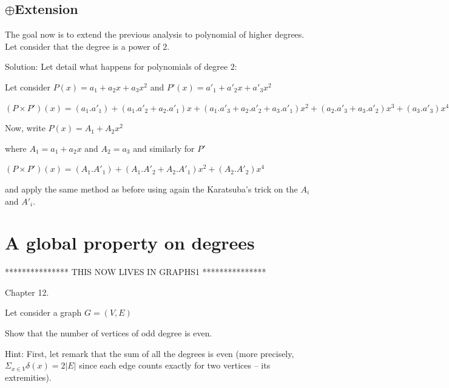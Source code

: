 \documentclass{article}[12pt]
\begin{document}
\subsection{$\oplus$Extension}

The goal now is to extend the previous analysis to polynomial of higher degrees.
Let consider that the degree is a power of $2$.
\bigskip

Solution:
Let detail what happens for polynomials of degree $2$:

Let consider $P(x) = a_1 + a_2 x + a_3 x^2$ and $P'(x) = a'_1 + a'_2 x + a'_3 x^2$

$(P \times P')(x) = (a_1.a'_1) + (a_1.a'_2 + a_2.a'_1) x + (a_1.a'_3 + a_2.a'_2 + a_3.a'_1) x^2 + (a_2.a'_3 + a_3.a'_2) x^3 +  (a_3.a'_3) x^4$
\bigskip

Now, write $P(x) = A_1 + A_2 x^2$ 

where $A_1 = a_1 + a_2 x$ and $A_2 = a_3$ and similarly for $P'$

$(P \times P')(x) = (A_1.A'_1) + (A_1.A'_2 + A_2.A'_1) x^2 + (A_2.A'_2) x^4$ 

and apply the same method as before using again the Karatsuba's trick on the $A_i$ and $A'_i$.



\section{A global property on degrees}

***************
THIS NOW LIVES IN GRAPHS1
***************

Chapter 12.

Let consider a graph $G=(V,E)$

Show that the number of vertices of odd degree is even.

Hint:
First, let remark that the sum of all the degrees is even
(more precisely, $\Sigma_{x \in V} \delta(x) = 2 |E|$ since each edge counts exactly for two vertices -- its extremities). 

%
%
%
%
%
\end{document}
